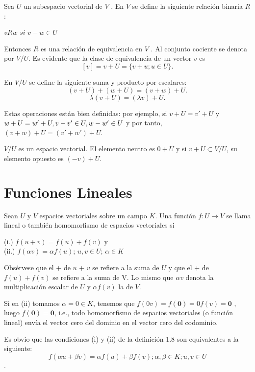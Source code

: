 		\begin{defi}
			Sea $U$ un subespacio vectorial de $V$ . En $V$ se define la siguiente
			relación binaria $R$: 
			 \begin{center}
			 	$vRw$  $si$  $v - w \in U $
			 \end{center}
			Entonces $R$ es una relación de equivalencia en $V$ . Al conjunto cociente se denota
			por $V/U$. Es evidente que la clase de equivalencia de un vector $v$ es
			\[ [v] = v + U = \{v + u; u \in U\}. \]
			
			En $V/U$ se define la siguiente suma y producto por escalares:
			\[ (v + U) + (w + U) = (v + w) + U. \]
			\[ \lambda{(v + U)} = (\lambda{v}) + U. \]
			
			Estas operaciones están bien definidas: por ejemplo, si $v + U = v' + U$ y $w + U =\\
			w' + U, v - v' \in U, w - w' \in U$ y por tanto, $(v + w) + U = (v' + w') + U$.
		\end{defi}
		\begin{pro}
			$V/U$ es un espacio vectorial. El elemento neutro es $0 + U$ y si
			$v + U \subset V/U$, su elemento opuesto es $(-v) + U$.
		\end{pro}
		\section{Funciones Lineales}
			\begin{defi}
				Sean $U$ y $ V $ espacios vectoriales sobre un campo $ K $. Una función $ f:U \rightarrow V $ 
				se llama lineal o también homomorfismo  de espacios vectoriales si   
				
						\normalfont 
						(i.) $ f(u + v) = f(u) + f(v) $ y\\
						(ii.) $ f(\alpha v) = \alpha f(u)  $;    $ u, v \in U$;    $ \alpha \in K $
			\end{defi}
				Obsérvese que el + de $ u $ + $ v $ se refiere a la suma de $ U $ y que el + de $ f(u) + f(v)  $ se refiere a la suma de V. Lo mismo que $ \alpha v $ denota la multiplicación escalar de $  U $ y $ \alpha f(v) $ la de $ V $.
				
				Si en (ii) tomamos $ \alpha = 0 \in K $, tenemos que $ f(0v) = f(\mathbf{0}) = 0 f(v) = \mathbf{0} $ , luego $ f(\mathbf{0}) = \mathbf{0} $, i.e., todo homomorfismo de espacios vectoriales (o función lineal) envía el vector cero del dominio en el vector cero del codominio.
				
				Es obvio que las condiciones (i) y (ii) de la definición 1.8 son equivalentes a la siguiente:
				\[ f(\alpha u + \beta v) = \alpha f(u) + \beta f(v); \alpha, \beta \in K ; u,v \in U\].
				
